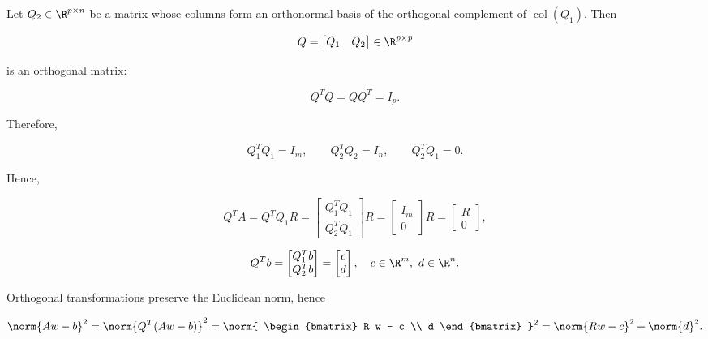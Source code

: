\noindent Let $Q_2 \in \R^{p\times n}$ be a matrix whose columns form an orthonormal basis of the orthogonal
complement of $\operatorname{col}(Q_1)$. Then

\begin{equation}
    Q =
    \begin{bmatrix}
    Q_1 & Q_2
    \end{bmatrix}
    \in \R^{p\times p}
\end{equation}

\noindent is an orthogonal matrix:

\begin{equation}
    Q^T Q = Q Q^T = I_p.
\end{equation}

\noindent Therefore,

\begin{equation}
    Q_1^T Q_1 = I_m,
    \qquad
    Q_2^T Q_2 = I_{n},
    \qquad
    Q_2^T Q_1 = 0.
\end{equation}

\noindent Hence,

\begin{equation}
    Q^T A = Q^T Q_1 R =
    \begin{bmatrix}
        Q_1^T Q_1 \\ Q_2^T Q_1
    \end{bmatrix} R =
    \begin{bmatrix}
        I_m \\ 0
    \end{bmatrix} R =
    \begin{bmatrix}
        R \\ 0
    \end{bmatrix},
\end{equation}

\begin{equation}
    Q^T b =
    \begin{bmatrix}
        Q_1^T b \\ Q_2^T b
    \end{bmatrix} =
    \begin{bmatrix}
        c \\ d
    \end{bmatrix},
    \quad c\in\R^m,\ d\in\R^{n}.
\end{equation}

\noindent Orthogonal transformations preserve the Euclidean norm, hence

\begin{equation}
\label{eq:qr_residual_split}
    \norm{Aw-b}^2
    =
    \norm{Q^T(Aw-b)}^2
    =
    \norm{
        \begin{bmatrix}
            R w - c \\ d
        \end{bmatrix}
    }^2
    =
    \norm{Rw-c}^2 + \norm{d}^2.
\end{equation}

